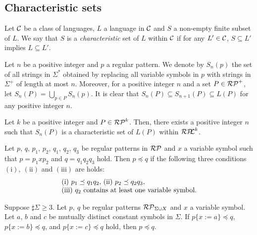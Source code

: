 \subsection{Characteristic sets}\label{subsec:charsets}

\begin{dfn}
    Let $\mathcal{C}$ be a class of languages, $L$ a language in $\mathcal{C}$ and
    $S$ a non-empty finite subset of $L$.
    We say that $S$ is a \textit{characteristic} set of $L$ within $\mathcal{C}$
    if for any $L' \in \mathcal{C}$,
    $S \subseteq L'$ implies $L \subseteq L'$.
\end{dfn}

Let $n$ be a positive integer and $p$ a regular pattern. 
We denote by $S_{n}(p)$ the set of all strings in $\Sigma^{\ast}$ obtained by replacing all variable symbols in $p$
with strings in $\Sigma^{+}$ of length at most $n$.
Moreover, for a positive integer $n$ and a set $P \in \mathcal{RP}^{+}$, 
let $S_{n}(P)=\bigcup_{p \in P}S_{n}(p)$.
It is clear that $S_{n}(P) \subseteq S_{n+1}(P) \subseteq L(P)$ for any positive integer $n$.

\begin{thm}
    Let $k$ be a positive integer and $P \in \mathcal{RP}^{k}$.
    Then, there exists a positive integer $n$ such that $S_{n}(P)$ is a characteristic set of $L(P)$ within $\mathcal{RP\!\!L}^{k}$.
\end{thm}

\begin{thm}\label{Sato1:Lemma9}
    Let $p$, $q$, $p_{1}$, $p_{2}$, $q_{1}$, $q_{2}$, $q_{3}$ be regular patterns in $\mathcal{RP}$ and $x$ a variable symbol such that 
    $p = p_{1}xp_{2}$ and $q = q_{1}q_{2}q_{3}$ hold.
    Then $p \preceq q$ if the following three conditions $(\mathrm{i}),~(\mathrm{ii})$ and $(\mathrm{iii})$ are holds:
    \[
        \begin{tabular}{ll}
            $(\mathrm{i})$ $p_{1} \preceq q_{1}q_{2},$
            $(\mathrm{ii})$ $p_{2} \preceq q_{2}q_{3},$ \\
            $(\mathrm{iii})$ $q_{2}$ contains at least one variable symbol.
        \end{tabular}
    \]
\end{thm}

\begin{lem}\label{Sato1:Lemma10}
    Suppose $\sharp \Sigma \geq 3$.
    {\color{red} Let $p,~q$ be regular patterns $\mathcal{RP}_{\Sigma\cup X}$
    and $x$ a variable symbol.
    Let $a$, $b$ and $c$ be mutually distinct constant symbols in $\Sigma$.
 If $p\{x:=a\}\preceq q$, $p\{x:=b\} \preceq q$, and $p\{x:=c\}\preceq q$ hold,
 then $p\preceq q$.} 
\end{lem}

